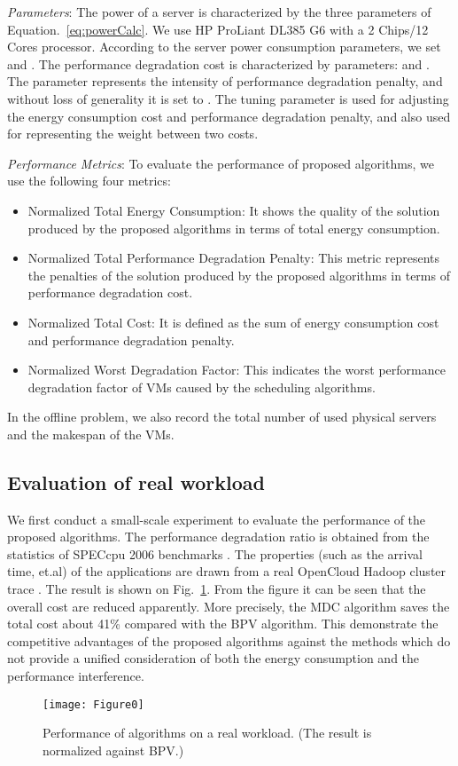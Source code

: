\documentclass[10pt,journal]{IEEEtran}
\begin{document}
\textit{Parameters}: The power of a server is characterized by the three parameters of Equation.~\ref{eq:powerCalc}. We use HP ProLiant DL385 G6 with a 2 Chips/12 Cores processor. According to the server power consumption parameters, we set  and . The performance degradation cost is characterized by parameters:  and . The parameter  represents the intensity of performance degradation penalty, and without loss of generality it is set to . The tuning parameter  is used for adjusting the energy consumption cost and performance degradation penalty, and also used for representing the weight between two costs.

\textit{Performance Metrics}: To evaluate the performance of proposed algorithms, we use the following four metrics:
\begin{itemize}
\item Normalized Total Energy Consumption: It shows the quality of the solution produced by the proposed algorithms in terms of total energy consumption.
\item Normalized Total Performance Degradation Penalty: This metric represents the penalties of the solution produced by the proposed algorithms in terms of performance degradation cost.
\item Normalized Total Cost: It is defined as the sum of energy consumption cost and performance degradation penalty.
\item Normalized Worst Degradation Factor: This indicates the worst performance degradation factor of VMs caused by the scheduling algorithms.
\end{itemize}

In the offline problem, we also record the total number of used physical servers and the makespan of the VMs.

\subsection{Evaluation of real workload}
We first conduct a small-scale experiment to evaluate the performance of the proposed algorithms. The performance degradation ratio is obtained from the statistics of SPECcpu 2006 benchmarks \cite{Kim13}. The properties (such as the arrival time, et.al) of the applications are drawn from a real OpenCloud Hadoop cluster trace \cite{Ren13}. The result is shown on Fig.~\ref{fig:eva_real_workload}. From the figure it can be seen that the overall cost are reduced apparently. More precisely, the MDC algorithm saves the total cost about 41\% compared with the BPV algorithm. This demonstrate the competitive advantages of the proposed algorithms against the methods which do not provide a unified consideration of both the energy consumption and the performance interference.
\begin{figure}[htbp]
\centering
\texttt{[image: Figure0]}
\centering
\caption{\label{fig:eva_real_workload} Performance of algorithms on a real workload. (The result is normalized against BPV.)}
\end{figure}
\end{document}
